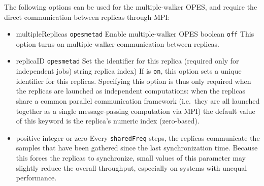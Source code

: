 
The following options can be used for the multiple-walker OPES, and require the direct communication between replicas through MPI:
\begin{itemize}
\item %
  \keydef
    {multipleReplicas}{%
    \texttt{opes{\textunderscore}metad}}{%
    Enable multiple-walker OPES}{%
    boolean}{%
    \texttt{off}}{%
    This option turns on multiple-walker communication between replicas.}
\item %
  \keydef
    {replicaID}{%
    \texttt{opes{\textunderscore}metad}}{%
    Set the identifier for this replica (required only for independent jobs)}{%
    string}{%
    replica index)}{%
    If  is \texttt{on}, this option sets a unique identifier for this replicas.
    Specifying this option is thus only required when the replicas are launched as independent computations:
    when the replicas share a common parallel communication framework (i.e.\ they are all launched together as a single message-passing computation via MPI) the default value of this keyword is the replica's numeric index (zero-based).
}
\item
  {positive integer or zero}
  {}
  {
    Every \texttt{sharedFreq} steps, the replicas communicate the samples that have been gathered since the last synchronization time.
    Because this forces the replicas to synchronize, small values of this parameter may slightly reduce the overall throughput, especially on systems with unequal performance.
  }
\end{itemize}


